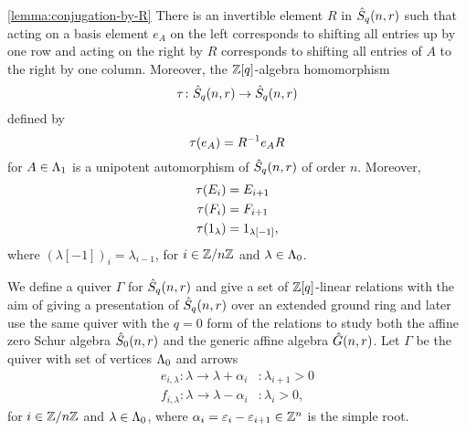 \documentclass[a4paper, 11pt, twoside]{report}
\begin{document}
\begin{lemma*}\ref{lemma:conjugation-by-R}
There is an invertible element $R$ in $\hat{S}_q(n,r)$ such that acting on a basis element $e_A$ on the left corresponds to shifting all entries up by one row and acting on the right by $R$ corresponds to shifting all entries of $A$ to the right by one column. Moreover, the $\mathbb{Z}[q]$-algebra homomorphism
\begin{equation*}
\tau\colon\hat{S}_q(n,r)\to\hat{S}_q(n,r)
\end{equation*}
defined by
\begin{equation*}
\tau{(e_A)} = R^{-1}e_AR
\end{equation*}
for $A\in\Lambda_1{}$ is a unipotent automorphism of $\hat{S}_q(n,r)$ of order $n$. Moreover,
\begin{align*}
\tau{(E_i)} &= E_{i+1}\\
\tau{(F_i)} &= F_{i+1}\\
\tau{(1_\lambda)} &= 1_{\lambda[-1]},
\end{align*}
where $(\lambda[-1])_i =\lambda_{i-1}$, for $i\in\mathbb{Z}/{n \mathbb{Z}}$ and $\lambda\in\Lambda_0{}$.
\end{lemma*}

We define a quiver $\Gamma$ for $\hat{S}_q(n,r)$ and give a set of $\mathbb{Z}[q]$-linear relations with the aim of giving a presentation of $\hat{S}_q(n,r)$ over an extended ground ring and later use the same quiver with the $q=0$ form of the relations to study both the affine zero Schur algebra $\hat{S}_0(n,r)$ and the generic affine algebra $\hat{G}(n,r)$. Let $\Gamma$ be the quiver with set of vertices $\Lambda_0{}$ and arrows
\begin{align*}
e_{i,\lambda}\colon\lambda\to \lambda +\alpha_i &: \lambda_{i+1} > 0\\
f_{i,\lambda}\colon\lambda\to\lambda -\alpha_i &: \lambda_i > 0,
\end{align*}
for $i\in\mathbb{Z}/{n \mathbb{Z}}$ and $\lambda\in\Lambda_0{}$, where $\alpha_i=\varepsilon_i - \varepsilon_{i+1}\in\mathbb{Z}^n$ is the simple root. 
\end{document}
